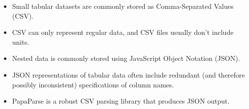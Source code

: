 \begin{itemize}
\item
  Small tabular datasets are commonly stored as Comma-Separated Values (CSV).
\item
  CSV can only represent regular data, and CSV files usually don't include units.
\item
  Nested data is commonly stored using JavaScript Object Notation (JSON).
\item
  JSON representations of tabular data often include redundant (and therefore possibly inconsistent) specifications of column names.
\item
  PapaParse is a robust CSV parsing library that produces JSON output.
\end{itemize}
